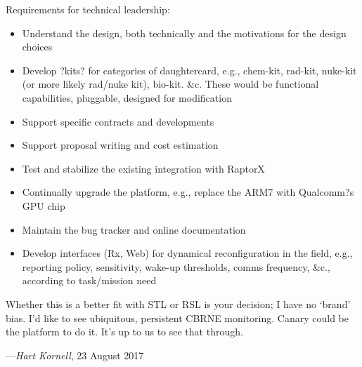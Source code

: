 \documentclass[11pt]{letter} %
\begin{document}
Requirements for technical leadership:
\begin{itemize}
\item Understand the design, both technically and the motivations for the design choices
\item Develop ?kits? for categories of daughtercard, e.g., chem-kit, rad-kit, nuke-kit (or more likely rad/nuke kit), bio-kit. \&c. These would be functional capabilities, pluggable, designed for modification
\item Support specific contracts and developments
\item Support proposal writing and cost estimation
\item Test and stabilize the existing integration with RaptorX
\item Continually upgrade the platform, e.g., replace the ARM7 with Qualcomm?s GPU chip
\item Maintain the bug tracker and online documentation
\item Develop interfaces (Rx, Web) for dynamical reconfiguration in the field, e.g., reporting policy, sensitivity, wake-up thresholds, comms frequency, \&c., according to task/mission need
\end{itemize}

\vspace{15pt}
\begin{center}
\end{center}
\vspace{15pt}

Whether this is a better fit with STL or RSL is your decision; I have no `brand' bias. I'd like to see ubiquitous, persistent CBRNE monitoring. Canary could be the platform to do it. It's up to us to see that through.

\vspace{20 pt}

---\textit{Hart Kornell}, 23 August 2017
\end{document}
